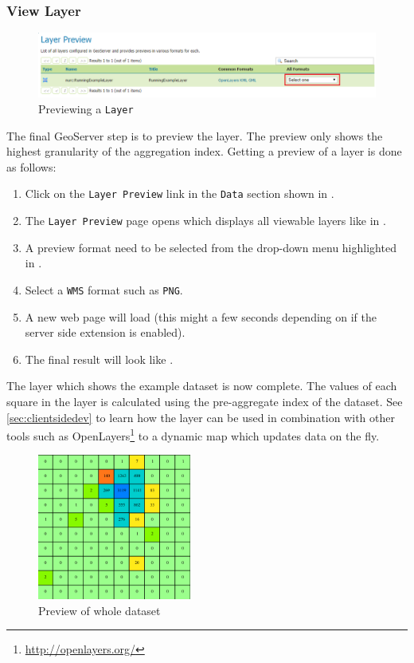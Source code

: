 \subsubsection{View Layer}
\begin{figure}[h!]
	\centering
	\vspace{-15pt}
	\includegraphics[width=\textwidth]{Figures/LayerPreview.png}
	\vspace{-25pt}
	\caption{Previewing a \lstinline|Layer|\label{fig:preview}}
\end{figure}
\noindent The final GeoServer step is to preview the layer. The preview only shows the highest granularity of the aggregation index. Getting a preview of a layer is done as follows:
\begin{enumerate}[resume]
	\item Click on the \lstinline|Layer Preview| link in the \lstinline|Data| section shown in .
	\item The \lstinline|Layer Preview| page opens which displays all viewable layers like in .
	\item A preview format need to be selected from the drop-down menu highlighted in .
	\item Select a \lstinline|WMS| format such as \lstinline|PNG|.
	\item A new web page will load (this might a few seconds depending on if the server side extension is enabled).
	\item The final result will look like .
\end{enumerate}
The layer which shows the example dataset is now complete. The values of each square in the layer is calculated using the pre-aggregate index of the dataset. See \ref{sec:clientsidedev} to learn how the layer can be used in combination with other tools such as OpenLayers\footnote{\url{http://openlayers.org/}} to a dynamic map which updates data on the fly.
\begin{figure}[h!]
	\centering
	\includegraphics[width=0.45\textwidth]{Figures/FinalResult.png}
	\vspace{-5pt}
	\caption{Preview of whole dataset \label{fig:result}}
\end{figure}